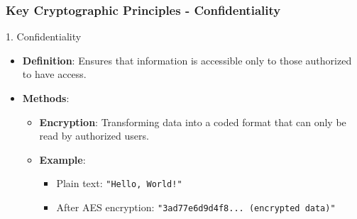 \documentclass{beamer}
\begin{document}
\begin{frame}[fragile]
    \frametitle{Key Cryptographic Principles - Confidentiality}
    \begin{block}{1. Confidentiality}
        \begin{itemize}
            \item \textbf{Definition}: Ensures that information is accessible only to those authorized to have access.
            \item \textbf{Methods}:
                \begin{itemize}
                    \item \textbf{Encryption}: Transforming data into a coded format that can only be read by authorized users.
                    \item \textbf{Example}: 
                      \begin{itemize}
                          \item Plain text: \texttt{"Hello, World!"}
                          \item After AES encryption: \texttt{"3ad77e6d9d4f8... (encrypted data)"}
                      \end{itemize}
                \end{itemize}
        \end{itemize}
    \end{block}
\end{frame}
\end{document}
